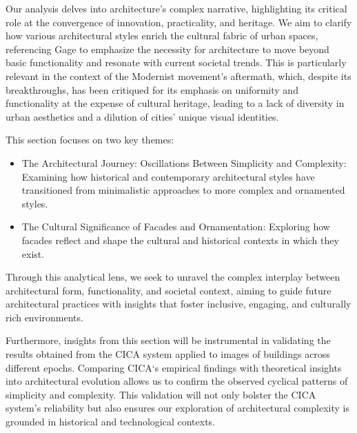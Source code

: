 Our analysis delves into architecture's complex narrative, highlighting its critical role at the convergence of innovation, practicality, and heritage.
We aim to clarify how various architectural styles enrich the cultural fabric of urban spaces, referencing Gage\cite{Gage2015} to emphasize the necessity for architecture to move beyond basic functionality and resonate with current societal trends. 
This is particularly relevant in the context of the Modernist movement's aftermath, which, despite its breakthroughs, has been critiqued for its emphasis on uniformity and functionality at the expense of cultural heritage, leading to a lack of diversity in urban aesthetics and a dilution of cities' unique visual identities\cite{Elsheshtawy1997}.

This section focuses on two key themes:

\begin{itemize}
    \item The Architectural Journey: Oscillations Between Simplicity and Complexity: Examining how historical and contemporary architectural styles have transitioned from minimalistic approaches to more complex and ornamented styles.
    \item The Cultural Significance of Facades and Ornamentation: Exploring how facades reflect and shape the cultural and historical contexts in which they exist.
\end{itemize}

Through this analytical lens, we seek to unravel the complex interplay between architectural form, functionality, and societal context, aiming to guide future architectural practices with insights that foster inclusive, engaging, and culturally rich environments.

Furthermore, insights from this section will be instrumental in validating the results obtained from the CICA system applied to images of buildings across different epochs.
Comparing CICA`s empirical findings with theoretical insights into architectural evolution allows us to confirm the observed cyclical patterns of simplicity and complexity.
This validation will not only bolster the CICA system's reliability but also ensures our exploration of architectural complexity is grounded in historical and technological contexts.



